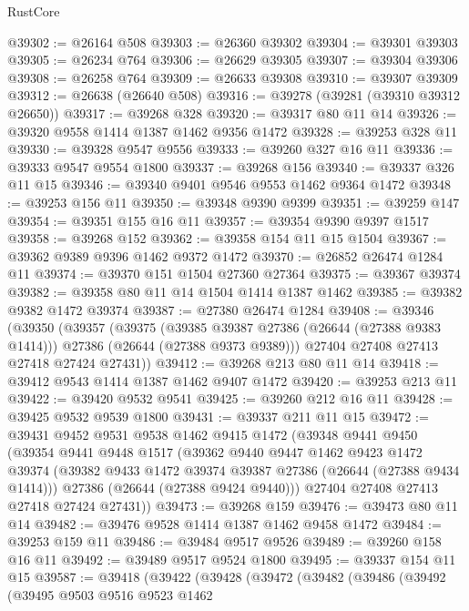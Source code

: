 \begin{lexlean}{RustCore}
\begin{coremodule}
@39302 := @26164 @508
@39303 := @26360 @39302
@39304 := @39301 @39303
@39305 := @26234 @764
@39306 := @26629 @39305
@39307 := @39304 @39306
@39308 := @26258 @764
@39309 := @26633 @39308
@39310 := @39307 @39309
@39312 := @26638 (@26640 @508)
@39316 := @39278 (@39281 (@39310 @39312 @26650))
@39317 := @39268 @328
@39320 := @39317 @80 @11 @14
@39326 := @39320 @9558 @1414 @1387 @1462 @9356 @1472
@39328 := @39253 @328 @11
@39330 := @39328 @9547 @9556
@39333 := @39260 @327 @16 @11
@39336 := @39333 @9547 @9554 @1800
@39337 := @39268 @156
@39340 := @39337 @326 @11 @15
@39346 := @39340 @9401 @9546 @9553 @1462 @9364 @1472
@39348 := @39253 @156 @11
@39350 := @39348 @9390 @9399
@39351 := @39259 @147
@39354 := @39351 @155 @16 @11
@39357 := @39354 @9390 @9397 @1517
@39358 := @39268 @152
@39362 := @39358 @154 @11 @15 @1504
@39367 := @39362 @9389 @9396 @1462 @9372 @1472
@39370 := @26852 @26474 @1284 @11
@39374 := @39370 @151 @1504 @27360 @27364
@39375 := @39367 @39374
@39382 := @39358 @80 @11 @14 @1504 @1414 @1387 @1462
@39385 := @39382 @9382 @1472 @39374
@39387 := @27380 @26474 @1284
@39408 := @39346
    (@39350
      (@39357
        (@39375
          (@39385 @39387 @27386 (@26644 (@27388 @9383 @1414)))
          @27386
          (@26644 (@27388 @9373 @9389)))
        @27404
        @27408
        @27413
        @27418
        @27424
        @27431))
@39412 := @39268 @213 @80 @11 @14
@39418 := @39412 @9543 @1414 @1387 @1462 @9407 @1472
@39420 := @39253 @213 @11
@39422 := @39420 @9532 @9541
@39425 := @39260 @212 @16 @11
@39428 := @39425 @9532 @9539 @1800
@39431 := @39337 @211 @11 @15
@39472 := @39431
    @9452
    @9531
    @9538
    @1462
    @9415
    @1472
    (@39348
      @9441
      @9450
      (@39354
        @9441
        @9448
        @1517
        (@39362
          @9440
          @9447
          @1462
          @9423
          @1472
          @39374
          (@39382 @9433 @1472 @39374 @39387 @27386 (@26644 (@27388 @9434 @1414)))
          @27386
          (@26644 (@27388 @9424 @9440)))
        @27404
        @27408
        @27413
        @27418
        @27424
        @27431))
@39473 := @39268 @159
@39476 := @39473 @80 @11 @14
@39482 := @39476 @9528 @1414 @1387 @1462 @9458 @1472
@39484 := @39253 @159 @11
@39486 := @39484 @9517 @9526
@39489 := @39260 @158 @16 @11
@39492 := @39489 @9517 @9524 @1800
@39495 := @39337 @154 @11 @15
@39587 := @39418
    (@39422
      (@39428
        (@39472
          (@39482
            (@39486
              (@39492
                (@39495
                  @9503
                  @9516
                  @9523
                  @1462

\end{coremodule}
\end{lexlean}
